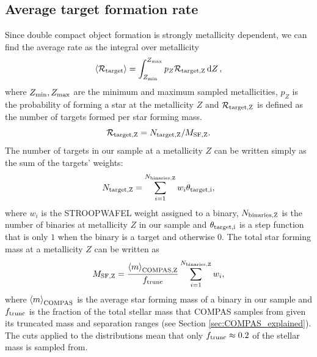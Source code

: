 \documentclass[twocolumn]{aastex63}
\newcommand{\avg}[1]{\left\langle#1\right\rangle}
\begin{document}
\subsection{Average target formation rate}
Since double compact object formation is strongly metallicity dependent, we can find the average rate as the integral over metallicity
\begin{equation}\label{eq:norm_avg_target_formation}
    \avg{ \mathcal{R}_{\rm target} } = \int_{Z_{\rm min}}^{Z_{\rm max}} p_{Z} \mathcal{R}_{\rm target, Z} \dd{Z},
\end{equation}
where $Z_{\rm min}, Z_{\rm max}$ are the minimum and maximum sampled metallicities, $p_Z$ is the probability of forming a star at the metallicity $Z$ \citep{Frankel+2018} and $\mathcal{R}_{\rm target, Z}$ is defined as the number of targets formed per star forming mass. 
\begin{equation}
    \mathcal{R}_{\rm target, Z} =  N_{\rm target, Z} / M_{\rm SF, Z}.
\end{equation}
The number of targets in our sample at a metallicity $Z$ can be written simply as the sum of the targets' weights:
\begin{equation}
    N_{\rm target, Z} = \sum_{i=1}^{N_{\rm binaries, Z}} w_i \theta_{\rm target, i},
\end{equation}
where $w_i$ is the STROOPWAFEL weight assigned to a binary, $N_{\rm binaries, Z}$ is the number of binaries at metallicity $Z$ in our sample and $\theta_{\rm target, i}$ is a step function that is only $1$ when the binary is a target and otherwise 0. The total star forming mass at a metallicity $Z$ can be written as
\begin{equation}
    M_{\rm SF, Z} = \frac{\avg{m}_{\rm COMPAS, Z}}{f_{\rm trunc}} \sum_{i=1}^{N_{\rm binaries, Z}} w_i,
\end{equation}
where $\avg{m}_{\rm COMPAS}$ is the average star forming mass of a binary in our sample and $f_{\rm trunc}$ is the fraction of the total stellar mass that COMPAS samples from given its truncated mass and separation ranges (see Section \ref{sec:COMPAS_explained}). The cuts applied to the distributions mean that only $f_{\rm trunc} \approx 0.2$ of the stellar mass is sampled from.
\end{document}
